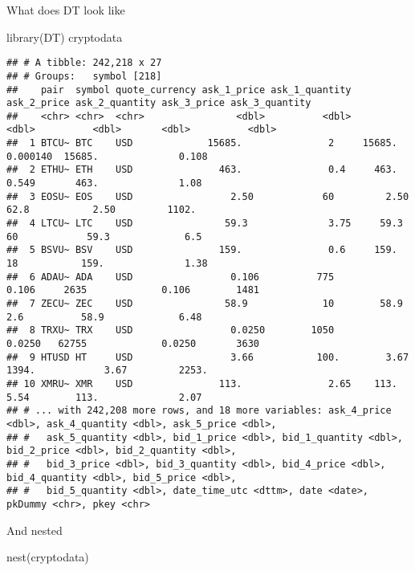 \documentclass[
]{book}
\newenvironment{Shaded}{\begin{snugshade}}{\end{snugshade}}
\newcommand{\FunctionTok}[1]{\textcolor[rgb]{0.00,0.00,0.00}{#1}}
\newcommand{\NormalTok}[1]{#1}
\begin{document}
What does DT look like

\begin{Shaded}
\begin{Highlighting}[]
\FunctionTok{library}\NormalTok{(DT)}
\NormalTok{cryptodata}
\end{Highlighting}
\end{Shaded}

\begin{verbatim}
## # A tibble: 242,218 x 27
## # Groups:   symbol [218]
##    pair  symbol quote_currency ask_1_price ask_1_quantity ask_2_price ask_2_quantity ask_3_price ask_3_quantity
##    <chr> <chr>  <chr>                <dbl>          <dbl>       <dbl>          <dbl>       <dbl>          <dbl>
##  1 BTCU~ BTC    USD             15685.               2     15685.           0.000140  15685.              0.108
##  2 ETHU~ ETH    USD               463.               0.4     463.           0.549       463.              1.08 
##  3 EOSU~ EOS    USD                 2.50            60         2.50        62.8           2.50         1102.   
##  4 LTCU~ LTC    USD                59.3              3.75     59.3         60            59.3             6.5  
##  5 BSVU~ BSV    USD               159.               0.6     159.          18           159.              1.38 
##  6 ADAU~ ADA    USD                 0.106          775         0.106     2635             0.106        1481    
##  7 ZECU~ ZEC    USD                58.9             10        58.9          2.6          58.9             6.48 
##  8 TRXU~ TRX    USD                 0.0250        1050         0.0250   62755             0.0250       3630    
##  9 HTUSD HT     USD                 3.66           100.        3.67      1394.            3.67         2253.   
## 10 XMRU~ XMR    USD               113.               2.65    113.           5.54        113.              2.07 
## # ... with 242,208 more rows, and 18 more variables: ask_4_price <dbl>, ask_4_quantity <dbl>, ask_5_price <dbl>,
## #   ask_5_quantity <dbl>, bid_1_price <dbl>, bid_1_quantity <dbl>, bid_2_price <dbl>, bid_2_quantity <dbl>,
## #   bid_3_price <dbl>, bid_3_quantity <dbl>, bid_4_price <dbl>, bid_4_quantity <dbl>, bid_5_price <dbl>,
## #   bid_5_quantity <dbl>, date_time_utc <dttm>, date <date>, pkDummy <chr>, pkey <chr>
\end{verbatim}

And nested

\begin{Shaded}
\begin{Highlighting}[]
\FunctionTok{nest}\NormalTok{(cryptodata)}
\end{Highlighting}
\end{Shaded}
\end{document}

